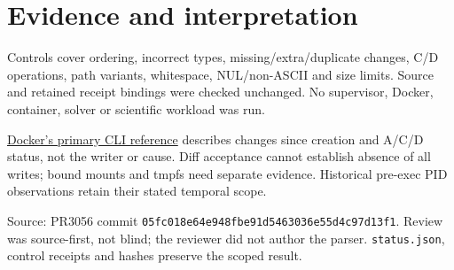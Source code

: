 \documentclass[10pt]{article}\usepackage[margin=0.8in]{geometry}\usepackage[T1]{fontenc}\usepackage{lmodern,hyperref}
\begin{document}
\section*{Evidence and interpretation}
Controls cover ordering, incorrect types, missing/extra/duplicate changes, C/D operations, path variants, whitespace, NUL/non-ASCII and size limits. Source and retained receipt bindings were checked unchanged. No supervisor, Docker, container, solver or scientific workload was run.

\href{https://docs.docker.com/reference/cli/docker/container/diff/}{Docker's primary CLI reference} describes changes since creation and A/C/D status, not the writer or cause. Diff acceptance cannot establish absence of all writes; bound mounts and tmpfs need separate evidence. Historical pre-exec PID observations retain their stated temporal scope.

Source: PR3056 commit \texttt{05fc018e64e948fbe91d5463036e55d4c97d13f1}. Review was source-first, not blind; the reviewer did not author the parser. \texttt{status.json}, control receipts and hashes preserve the scoped result.
\end{document}
